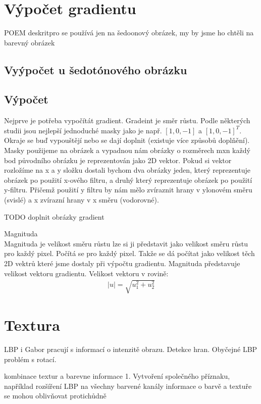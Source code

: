\documentclass[czech,BP]{thesiskiv}
\begin{document}
\section{Výpočet gradientu}
POEM deskritpro se používá jen na šedoonový obrázek, my by jsme ho chtěli na barevný obrázek
\subsection{Vyýpočet u šedotónového obrázku}

\subsection{Výpočet}
Nejprve je potřeba vypočítát gradient. Gradeint je směr růstu. Podle některých studii jsou nejlepší jednoduché masky jako je např. $[1, 0, -1]$ a $[1, 0, -1]^T$. Okraje se buď vypouštějí nebo se dají doplnit (existuje více způsobů doplňění). Masky použijeme na obrázek a vypadnou nám obrázky o rozměrech mxn každý bod původního obrázku je reprezentován jako 2D vektor. Pokud si vektor rozložíme na x a y složku dostali bychom dva obrázky jeden, který reprezentuje obrázek po použití x-ového filtru, a druhý který reprezentuje obrázek po použití y-filtru. Přičemž použití  y filtru by nám mělo zvíraznit hrany v ylonovém směru (svislé) a x zvírazní hrany v x směru (vodorovné).

TODO doplnit obrázky gradient 

Magnituda\\
Magnituda je velikost směru růstu lze si ji představit jako velikost směru růstu pro každý pixel. Počítá se pro každý pixel. Takže se dá počítat jako velikost těch 2D vektrů které jsme dostaly při výpočtu gradientu.
Magnituda představuje velikost vektoru gradientu.
Velikost vektoru v rovině:
\begin{align}
   \label{velikost_vektoru} |u| = \sqrt{u_1^2 + u_2^2}
\end{align}



\section{Textura}
LBP i Gabor pracují s informací o intenzitě obrazu. Detekce hran. Obyčejné LBP problém s rotací.


kombinace textur a barevne informace
1. Vytvoření společného příznaku, 
například rozšíření LBP na všechny barvené kanály
informace o barvě a textuře se mohou oblivňovat protichůdně
\end{document}
